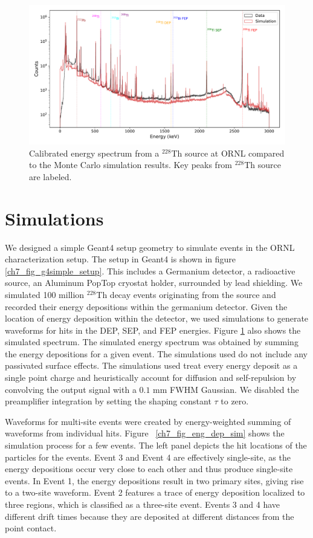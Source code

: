 \begin{figure}%
\centering
    \includegraphics[width=0.99\linewidth,trim={0.5cm 0pc 0.5cm 0pc},clip]{ch7/figs/energy_spectrum_comparison.pdf}
    \caption{Calibrated energy spectrum from a $^{228}$Th source at ORNL compared to the Monte Carlo simulation results. Key peaks from $^{228}$Th source are labeled.}
   \label{ch7_fig_eng_spec_comp}
\end{figure}

\section{Simulations}
We designed a simple Geant4 setup geometry to simulate events in the ORNL characterization setup. The setup in Geant4 is shown in figure \ref{ch7_fig_g4simple_setup}. This includes a Germanium detector, a radioactive source, an Aluminum PopTop cryostat holder, surrounded by lead shielding. We simulated 100 million $^{228}$Th decay events originating from the source and recorded their energy depositions within the germanium detector. Given the location of energy deposition within the detector, we used {\siggen} simulations to generate waveforms for hits in the DEP, SEP, and FEP energies. Figure \ref{ch7_fig_eng_spec_comp} also shows the simulated spectrum. The simulated energy spectrum was obtained by summing the energy depositions for a given event. The {\siggen} simulations used do not include any passivated surface effects. The {\siggen} simulations used treat every energy deposit as a single point charge and heuristically account for diffusion and self-repulsion by convolving the output signal with a $0.1$ mm FWHM Gaussian. We disabled the preamplifier integration by setting the shaping constant $\tau$ to zero.

Waveforms for multi-site events were created by energy-weighted summing of waveforms from individual hits. Figure ~\ref{ch7_fig_eng_dep_sim} shows the simulation process for a few events. The left panel depicts the hit locations of the particles for the events. Event 3 and Event 4 are effectively single-site, as the energy depositions occur very close to each other and thus produce single-site events. In Event 1, the energy depositions result in two primary sites, giving rise to a two-site waveform. Event 2 features a trace of energy deposition localized to three regions, which is classified as a three-site event. Events 3 and 4 have different drift times because they are deposited at different distances from the point contact.


